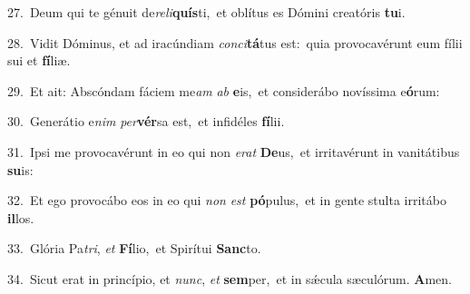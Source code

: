 {\numbfont\textcolor{\numbcolor}{27.}}~Deum qui te génuit de\-\textit{re}\-\textit{li}\textbf{quís}ti,~\star et oblítus es Dómini creatóris \textbf{tu}\-i.\par
{\numbfont\textcolor{\numbcolor}{28.}}~Vidit Dóminus, et ad iracúndiam \textit{con}\-\textit{ci}\textbf{tá}tus est:~\star quia provocavérunt eum fílii sui et \textbf{fí}\-liæ.\par
{\numbfont\textcolor{\numbcolor}{29.}}~Et ait: Abscóndam fáciem me\textit{am} \textit{ab} \textbf{e}\-is,~\star et considerábo novíssima e\-\textbf{ó}\-rum:\par
{\numbfont\textcolor{\numbcolor}{30.}}~Generátio e\textit{nim} \textit{per}\-\textbf{vér}sa est,~\star et infidéles \textbf{fí}\-lii.\par
{\numbfont\textcolor{\numbcolor}{31.}}~Ipsi me provocavérunt in eo qui non \textit{e}\-\textit{rat} \textbf{De}\-us,~\star et irritavérunt in vanitátibus \textbf{su}\-is:\par
{\numbfont\textcolor{\numbcolor}{32.}}~Et ego provocábo eos in eo qui \textit{non} \textit{est} \textbf{pó}\-pulus,~\star et in gente stulta irritábo \textbf{il}\-los.\par
{\numbfont\textcolor{\numbcolor}{33.}}~Glória Pa\-\textit{tri}\-, \textit{et} \textbf{Fí}\-lio,~\star et Spirítui \textbf{Sanc}\-to.\par
{\numbfont\textcolor{\numbcolor}{34.}}~Sicut erat in princípio, et \textit{nunc}\-, \textit{et} \textbf{sem}\-per,~\star et in sǽcula sæculórum. \textbf{A}\-men.\par
